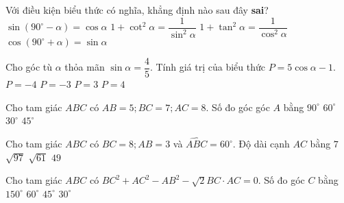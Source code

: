 \begin{ex}%
Với điều kiện biểu thức có nghĩa, khẳng định nào sau đây {\bf sai}?
\choice
{$\sin\left(90^\circ-\alpha\right)=\cos \alpha$}
{$1+\cot^2\alpha=\dfrac{1}{\sin^2\alpha}$}
{$1+\tan^2\alpha=\dfrac{1}{\cos^2\alpha}$}
{\True $\cos\left(90^\circ+\alpha\right)=\sin\alpha$}
\end{ex}

\begin{ex}%
Cho góc tù $\alpha$ thỏa mãn $\sin\alpha=\dfrac{4}{5}$. Tính giá trị của biểu thức $P=5\cos\alpha-1$.
\choice
{\True $P=-4$}
{$P=-3$}
{$P=3$}
{$P=4$}
\end{ex}
\begin{ex}%
Cho tam giác $ABC$ có $AB=5; BC=7; AC=8$. Số đo góc góc $A$ bằng
\choice
{$90^\circ$}
{\True $60^\circ$}
{$30^\circ$}
{$45^\circ$}
\end{ex}

\begin{ex}%
Cho tam giác $ABC$ có $BC=8; AB=3$ và $\widehat{ABC}=60^\circ$. Độ dài cạnh $AC$ bằng
\choice
{\True $7$}
{$\sqrt{97}$}
{$\sqrt{61}$}
{$49$}
\end{ex}
\begin{ex}%
Cho tam giác $ABC$ có $BC^2+AC^2-AB^2-\sqrt{2}BC\cdot AC=0$. Số đo góc $C$ bằng
\choice
{$150^\circ$}
{$60^\circ$}
{\True $45^\circ$}
{$30^\circ$}
\end{ex}

